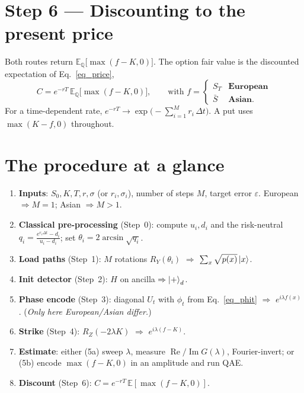 \documentclass{article}
\newcommand{\deltat}{\Delta t}
\begin{document}
\section{Step 6 --- Discounting to the present price}

Both routes return $\mathbb{E}_{\mathbb{Q}}\!\big[\max(f-K,0)\big]$. The option fair value is the discounted expectation of Eq.~\eqref{eq_price},
\begin{equation}
C = e^{-rT}\,\mathbb{E}_{\mathbb{Q}}\!\big[\max(f-K,0)\big],
\qquad
\text{with }
f=\begin{cases}S_T & \textbf{European}\\[2pt]\bar S & \textbf{Asian.}\end{cases}
\end{equation}
For a time-dependent rate, $e^{-rT}\to\exp\!\big(-\sum_{i=1}^{M} r_i\,\deltat\big)$. A put uses $\max(K-f,0)$ throughout.


\section{The procedure at a glance}

\begin{enumerate}
    \item \textbf{Inputs}: $S_0,K,T,r,\sigma$ (or $r_i,\sigma_i$), number of steps $M$, target error $\varepsilon$. European $\Rightarrow M=1$; Asian $\Rightarrow M>1$.
    \item \textbf{Classical pre-processing} (Step~0): compute $u_i,d_i$ and the risk-neutral $q_i=\frac{e^{r_i\deltat}-d_i}{u_i-d_i}$; set $\theta_i=2\arcsin\sqrt{q_i}$.
    \item \textbf{Load paths} (Step~1): $M$ rotations $R_Y(\theta_i)$ $\Rightarrow$ $\sum_x\sqrt{p(x)}\ket{x}$.
    \item \textbf{Init detector} (Step~2): $H$ on ancilla $\Rightarrow \ket{+}_d$.
    \item \textbf{Phase encode} (Step~3): diagonal $U_t$ with $\phi_t$ from Eq.~\eqref{eq_phit} $\Rightarrow$ $e^{i\lambda f(x)}$. (\emph{Only here European/Asian differ.})
    \item \textbf{Strike} (Step~4): $R_Z(-2\lambda K)$ $\Rightarrow$ $e^{i\lambda(f-K)}$.
    \item \textbf{Estimate}: either (5a) sweep $\lambda$, measure $\operatorname{Re}/\operatorname{Im}G(\lambda)$, Fourier-invert; or (5b) encode $\max(f-K,0)$ in an amplitude and run QAE.
    \item \textbf{Discount} (Step~6): $C=e^{-rT}\,\mathbb{E}[\max(f-K,0)]$.
\end{enumerate}
\end{document}
